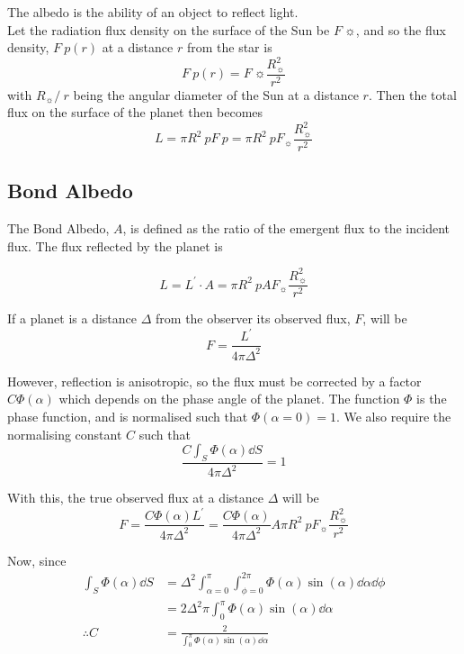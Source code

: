 The albedo is the ability of an object to reflect light. \\
Let the radiation flux density on the surface of the Sun be $F~\sun$,
and so the flux density, $F~p(r)$ at a distance $r$ from the star is
\begin{equation}
  \label{eq:1}
  F~p(r) = F~\sun \frac{R^2_{\sun}}{r^2}
\end{equation}
with $R_{\sun} /\ r$ being the angular diameter of the Sun at a
distance $r$. Then the total flux on the surface of the planet then becomes 
\[ L = \pi R^2~p F~p = \pi R^2~p F_{\sun} \frac{R^2_{\sun}}{r^2} \]

\subsection{Bond Albedo}
\label{sec:bond-albedo}

The Bond Albedo, $A$, is defined as the ratio of the emergent flux to
the incident flux. The flux reflected by the planet is

\begin{equation}
  \label{eq:2}
  L = L^{\prime} \cdot A =  \pi R^2~p A F_{\sun} \frac{R^2_{\sun}}{r^2}
\end{equation}

If a planet is a distance $\Delta$ from the observer its observed
flux, $F$, will be
\begin{equation}
  \label{eq:3}
  F = \frac{L^{\prime}}{4 \pi \Delta^2}
\end{equation}

However, reflection is anisotropic, so the flux must be corrected by a
factor $C \Phi(\alpha)$ which depends on the phase angle of the
planet. The function $\Phi$ is the phase function, and is normalised
such that $\Phi(\alpha = 0) = 1$. We also require the normalising
constant $C$ such that
\begin{equation}
  \label{eq:4}
  \frac{ C \int_S \Phi(\alpha) \dd{S}}{4 \pi \Delta^2} = 1
\end{equation}

With this, the true observed flux at a distance $\Delta$ will be
\begin{equation}
  \label{eq:5}
  F = \frac{C \Phi(\alpha) L^{\prime}}{4 \pi \Delta^2} 
    = \frac{C \Phi(\alpha)}{4 \pi \Delta^2} A \pi R^2~p F_{\sun} \frac{R_{\sun}^2}{r^2}
\end{equation}

Now, since
\begin{align*}
  \int_S \Phi(\alpha) \dd{S} & = \Delta^2 \int_{\alpha=0}^{\pi} \int_{\phi=0}^{2\pi} \Phi(\alpha) \sin(\alpha) \dd{\alpha} \dd{\phi} \\
                             & = 2 \Delta^2 \pi \int_0^{\pi} \Phi(\alpha) \sin(\alpha) \dd{\alpha}                                   \\
  \therefore C               & = \frac{2}{\int_0^{\pi} \Phi(\alpha) \sin(\alpha) \dd{\alpha}}
\end{align*}

